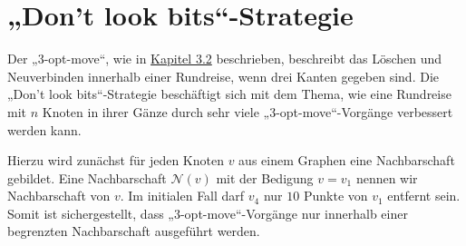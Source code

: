 \section{„Don't look bits“-Strategie}
Der „3-opt-move“, wie in  \hyperref[ls3opt_func]{Kapitel 3.2} beschrieben, beschreibt das Löschen
und Neuverbinden innerhalb einer Rundreise, wenn drei
Kanten gegeben sind. Die „Don't look bits“-Strategie beschäftigt sich
mit dem Thema, wie eine Rundreise mit $n$ Knoten in ihrer Gänze durch
sehr viele „3-opt-move“-Vorgänge verbessert werden kann.

Hierzu wird zunächst für jeden Knoten $v$ aus einem Graphen
eine Nachbarschaft gebildet. Eine Nachbarschaft $\mathcal{N}(v)$ mit der
Bedigung $v = v_1$ nennen wir Nachbarschaft von $v$. Im initialen Fall 
darf $v_4$ nur $10$ Punkte von $v_1$
entfernt sein. Somit ist sichergestellt, dass „3-opt-move“-Vorgänge nur
innerhalb einer begrenzten Nachbarschaft ausgeführt werden.

